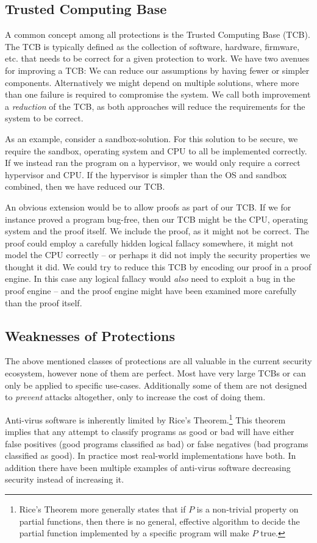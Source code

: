 \subsection{Trusted Computing Base}
A common concept among all protections is the Trusted Computing Base
  (TCB). The TCB is typically defined as the collection of software, hardware,
firmware, etc. that needs to be correct for a given protection to work. We have
two avenues for improving a TCB: We can reduce our assumptions by having fewer
or simpler components. Alternatively we might depend on multiple solutions,
where more than one failure is required to compromise the system. We call both
improvement a \emph{reduction} of the TCB, as both approaches will reduce the
requirements for the system to be correct.

As an example, consider a sandbox-solution. For this solution to be secure, we
require the sandbox, operating system and CPU to all be implemented
correctly. If we instead ran the program on a hypervisor, we would only require
a correct hypervisor and CPU. If the hypervisor is simpler than the OS and
sandbox combined, then we have reduced our TCB.

An obvious extension would be to allow proofs as part of our TCB. If we for
instance proved a program bug-free, then our TCB might be the CPU, operating
system and the proof itself. We include the proof, as it might not be
correct. The proof could employ a carefully hidden logical fallacy somewhere, it
might not model the CPU correctly -- or perhaps it did not imply the security
properties we thought it did. We could try to reduce this TCB by encoding our
proof in a proof engine. In this case any logical fallacy would \emph{also} need
to exploit a bug in the proof engine -- and the proof engine might have been
examined more carefully than the proof itself.

\subsection{Weaknesses of Protections}
The above mentioned classes of protections are all valuable in the current
security ecosystem, however none of them are perfect. Most have very large TCBs
or can only be applied to specific use-cases. Additionally some of them are not
designed to \emph{prevent} attacks altogether, only to increase the cost of
doing them.

Anti-virus software is inherently limited by Rice's Theorem.\footnote{Rice's
  Theorem more generally states that if $P$ is a non-trivial property on partial
  functions, then there is no general, effective algorithm to decide the partial
  function implemented by a specific program will make $P$ true.} This theorem
implies that any attempt to classify programs as good or bad will have either
false positives (good programs classified as bad) or false negatives (bad
programs classified as good). In practice most real-world implementations have
both. In addition there have been multiple examples of anti-virus software
decreasing security instead of increasing it.\cite{antivirus}

